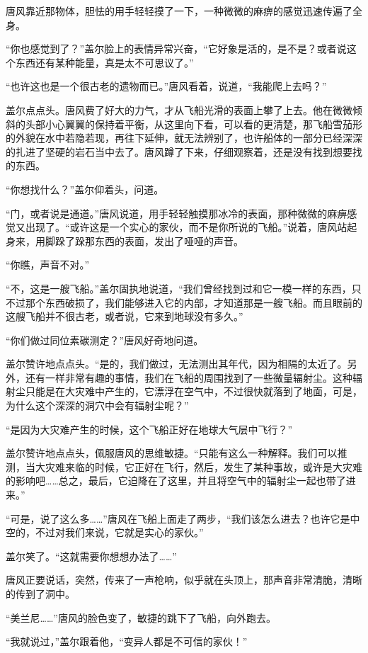 唐风靠近那物体，胆怯的用手轻轻摸了一下，一种微微的麻痹的感觉迅速传遍了全身。

“你也感觉到了？”盖尔脸上的表情异常兴奋，“它好象是活的，是不是？或者说这个东西还有某种能量，真是太不可思议了。”

“也许这也是一个很古老的遗物而已。”唐风看着，说道，“我能爬上去吗？”

盖尔点点头。唐风费了好大的力气，才从飞船光滑的表面上攀了上去。他在微微倾斜的头部小心翼翼的保持着平衡，从这里向下看，可以看的更清楚，那飞船雪茄形的外貌在水中若隐若现，再往下延伸，就无法辨别了，也许船体的一部分已经深深的扎进了坚硬的岩石当中去了。唐风蹲了下来，仔细观察着，还是没有找到想要找的东西。

“你想找什么？”盖尔仰着头，问道。

“门，或者说是通道。”唐风说道，用手轻轻触摸那冰冷的表面，那种微微的麻痹感觉又出现了。“或许这是一个实心的家伙，而不是你所说的飞船。”说着，唐风站起身来，用脚跺了跺那东西的表面，发出了哑哑的声音。

“你瞧，声音不对。”

“不，这是一艘飞船。”盖尔固执地说道，“我们曾经找到过和它一模一样的东西，只不过那个东西破损了，我们能够进入它的内部，才知道那是一艘飞船。而且眼前的这艘飞船并不很古老，或者说，它来到地球没有多久。”

“你们做过同位素碳测定？”唐风好奇地问道。

盖尔赞许地点点头。“是的，我们做过，无法测出其年代，因为相隔的太近了。另外，还有一样非常有趣的事情，我们在飞船的周围找到了一些微量辐射尘。这种辐射尘只能是在大灾难中产生的，它漂浮在空气中，不过很快就落到了地面，可是，为什么这个深深的洞穴中会有辐射尘呢？”

“是因为大灾难产生的时候，这个飞船正好在地球大气层中飞行？”

盖尔赞许地点点头，佩服唐风的思维敏捷。“只能有这么一种解释。我们可以推测，当大灾难来临的时候，它正好在飞行，然后，发生了某种事故，或许是大灾难的影响吧……总之，最后，它迫降在了这里，并且将空气中的辐射尘一起也带了进来。”

“可是，说了这么多……”唐风在飞船上面走了两步，“我们该怎么进去？也许它是中空的，不过对我们来说，它就是实心的家伙。”

盖尔笑了。“这就需要你想想办法了……”

唐风正要说话，突然，传来了一声枪响，似乎就在头顶上，那声音非常清脆，清晰的传到了洞中。

“美兰尼……”唐风的脸色变了，敏捷的跳下了飞船，向外跑去。

“我就说过，”盖尔跟着他，“变异人都是不可信的家伙！”

